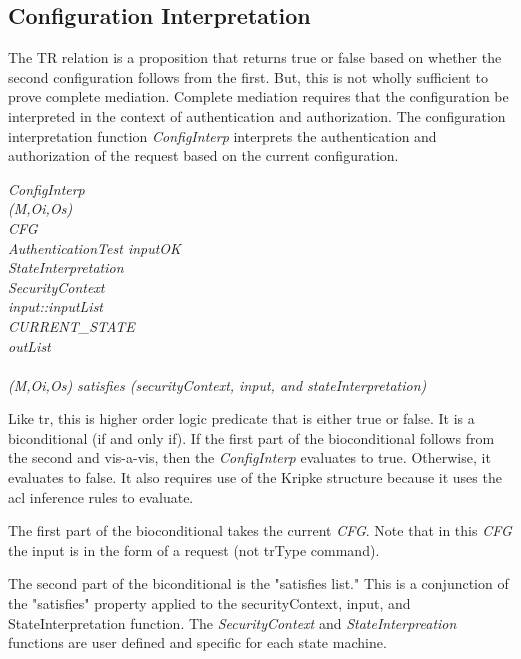\documentclass[../../main/main.tex]{subfiles}
\begin{document}
\subsection{Configuration Interpretation}
The TR relation is a proposition that returns true or false based on whether the second configuration follows from the first.  But, this is not wholly sufficient to prove complete mediation.  Complete mediation requires that the configuration be interpreted in the context of authentication and authorization.  The configuration interpretation function \emph{ConfigInterp} interprets the authentication and authorization of the request based on the current configuration.  

\emph{
ConfigInterp\\
\hspace{1cm}(M,Oi,Os)\\
\hspace{1cm}CFG\\
\hspace{2cm}AuthenticationTest inputOK\\
\hspace{2cm}StateInterpretation \\
\hspace{2cm}SecurityContext\\
\hspace{2cm}input::inputList\\
\hspace{2cm}CURRENT_STATE\\
\hspace{2cm}outList\\
\hspace{1cm}\HOLSymConst{\HOLTokenEquiv{}}\\
\hspace{1cm} (M,Oi,Os) satisfies (securityContext, input, and stateInterpretation)
}

Like \gls{tr}, this is higher order logic predicate that is either true or false.  It is a biconditional (if and only if).  If the first part of the bioconditional follows from the second and vis-a-vis, then the \emph{ConfigInterp} evaluates to true.  Otherwise, it evaluates to false.  It also requires use of the Kripke structure because it uses the \gls{acl} inference rules to evaluate.  

The first part of the bioconditional takes the current \emph{CFG}.  Note that in this \emph{CFG} the input is in the form of a request (not trType command).  

The second part of the biconditional is the "satisfies list."  This is a conjunction of the "satisfies" property applied to the securityContext, input, and StateInterpretation function. The \emph{SecurityContext} and \emph{StateInterpreation} functions are user defined and specific for each state machine.
\end{document}
